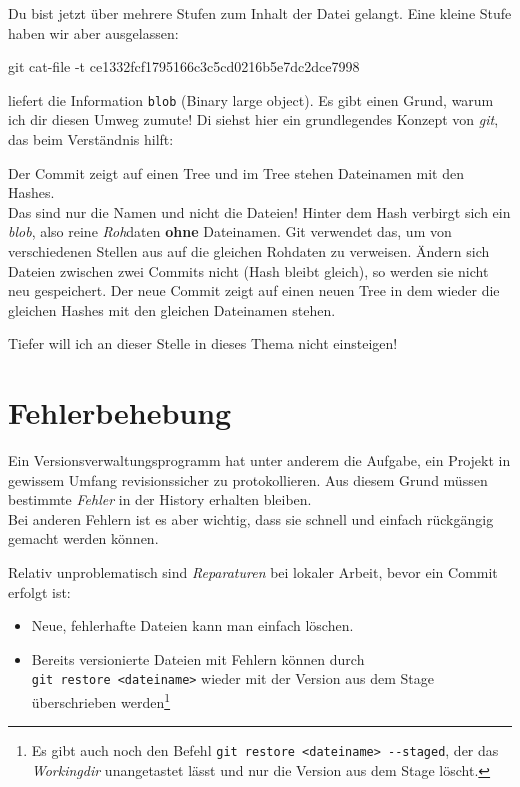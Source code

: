 \documentclass[
  letterpaper,
  DIV=11]{scrreprt}
\newenvironment{Shaded}{\begin{snugshade}}{\end{snugshade}}
\newcommand{\AttributeTok}[1]{\textcolor[rgb]{0.40,0.45,0.13}{#1}}
\newcommand{\FunctionTok}[1]{\textcolor[rgb]{0.28,0.35,0.67}{#1}}
\newcommand{\NormalTok}[1]{\textcolor[rgb]{0.00,0.23,0.31}{#1}}
\providecommand{\tightlist}{%
  \setlength{\itemsep}{0pt}\setlength{\parskip}{0pt}}\usepackage{longtable,booktabs,array}
\newcommand{\git}{\textit{git}\xspace}
\newcommand{\work}{\textit{Workingdir}\xspace}
\begin{document}
Du bist jetzt über mehrere Stufen zum Inhalt der Datei gelangt. Eine
kleine Stufe haben wir aber ausgelassen:

\begin{Shaded}
\begin{Highlighting}[]
\FunctionTok{git}\NormalTok{ cat{-}file }\AttributeTok{{-}t}\NormalTok{ ce1332fcf1795166c3c5cd0216b5e7dc2dce7998}
\end{Highlighting}
\end{Shaded}

liefert die Information \texttt{blob} (Binary large object). Es gibt
einen Grund, warum ich dir diesen Umweg zumute! Di siehst hier ein
grundlegendes Konzept von \git, das beim Verständnis hilft:

Der Commit zeigt auf einen Tree und im Tree stehen Dateinamen mit den
Hashes.\\
Das sind nur die Namen und nicht die Dateien! Hinter dem Hash verbirgt
sich ein \emph{blob}, also reine \emph{Roh}daten \textbf{ohne}
Dateinamen. Git verwendet das, um von verschiedenen Stellen aus auf die
gleichen Rohdaten zu verweisen. Ändern sich Dateien zwischen zwei
Commits nicht (Hash bleibt gleich), so werden sie nicht neu gespeichert.
Der neue Commit zeigt auf einen neuen Tree in dem wieder die gleichen
Hashes mit den gleichen Dateinamen stehen.

Tiefer will ich an dieser Stelle in dieses Thema nicht einsteigen!

\section{Fehlerbehebung}\label{fehlerbehebung}

Ein Versionsverwaltungsprogramm hat unter anderem die Aufgabe, ein
Projekt in gewissem Umfang revisionssicher zu protokollieren. Aus diesem
Grund müssen bestimmte \emph{Fehler} in der History erhalten bleiben.\\
Bei anderen Fehlern ist es aber wichtig, dass sie schnell und einfach
rückgängig gemacht werden können.

Relativ unproblematisch sind \emph{Reparaturen} bei lokaler Arbeit,
bevor ein Commit erfolgt ist:

\begin{itemize}
\tightlist
\item
  Neue, fehlerhafte Dateien kann man einfach löschen.
\item
  Bereits versionierte Dateien mit Fehlern können durch
  \texttt{git\ restore\ \textless{}dateiname\textgreater{}} wieder mit
  der Version aus dem Stage überschrieben werden\footnote{Es gibt auch
    noch den Befehl
    \texttt{git\ restore\ \textless{}dateiname\textgreater{}\ -\/-staged},
    der das \work unangetastet lässt und nur die Version aus dem Stage
    löscht.}
\end{itemize}
\end{document}
